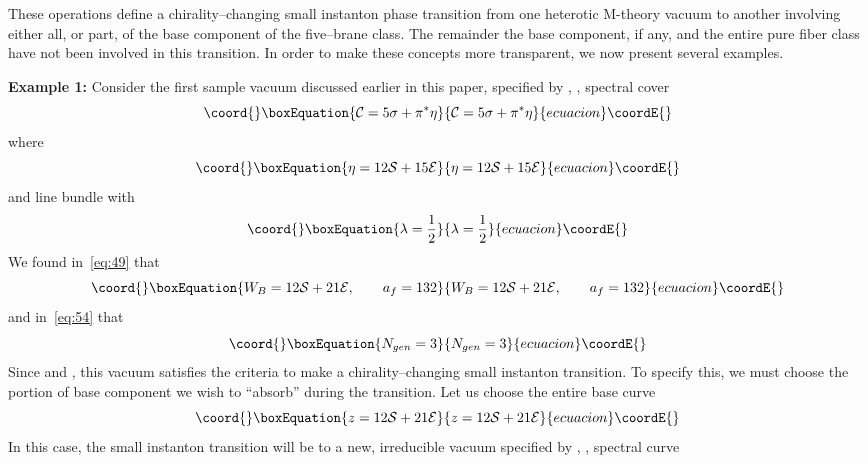 \documentclass[a4paper,12pt]{article}
\numberwithin{equation}{section}
\def\cC{{\mathcal C}}
\def\cE{{\mathcal E}}
\def\cN{{\mathcal N}}
\def\cS{{\mathcal S}}
\theoremstyle{plain}
\begin{document}
These operations define a chirality--changing small instanton phase transition
from one heterotic M-theory vacuum to another involving either all, or part, of
the base component of the five--brane class. The remainder the base
component, if any, and the entire pure fiber class have not been involved in
this transition. In order to make these concepts more transparent, we now
present several examples.

\bigskip

\noindent
{\bf Example 1:}
Consider the first sample vacuum discussed earlier in this paper, specified by
\coordHE{}, \coordHE{}, spectral cover
\begin{equation}\coord{}\boxEquation{
\cC=5\sigma+\pi^{*}\eta
\label{eq:103}
}{
\cC=5\sigma+\pi^{*}\eta
}{ecuacion}\coordE{}\end{equation}
where
\begin{equation}\coord{}\boxEquation{
\eta=12\cS+15\cE
\label{eq:104}
}{
\eta=12\cS+15\cE
}{ecuacion}\coordE{}\end{equation}
and line bundle \myHighlight{$\cN$}\coordHE{} with
\begin{equation}\coord{}\boxEquation{
\lambda=\frac{1}{2}
\label{eq:105}
}{
\lambda=\frac{1}{2}
}{ecuacion}\coordE{}\end{equation}
We found in~\eqref{eq:49} that
\begin{equation}\coord{}\boxEquation{
W_{B}=12\cS+21\cE, \qquad a_{f}=132
\label{eq:106}
}{
W_{B}=12\cS+21\cE, \qquad a_{f}=132
}{ecuacion}\coordE{}\end{equation}
and in~\eqref{eq:54} that 
\begin{equation}\coord{}\boxEquation{
N_{gen}=3
\label{eq:107}
}{
N_{gen}=3
}{ecuacion}\coordE{}\end{equation}
Since \coordHE{} and \coordHE{}, this vacuum satisfies the
criteria to make a chirality--changing small instanton transition. To specify
this, we must choose the portion of base component \coordHE{} we wish to
``absorb'' during the transition. Let us choose the entire base curve
\begin{equation}\coord{}\boxEquation{
z=12\cS+21\cE
\label{eq:108}
}{
z=12\cS+21\cE
}{ecuacion}\coordE{}\end{equation}
In this case, the small instanton transition will be to a new, irreducible
vacuum specified by \coordHE{}, \coordHE{}, spectral curve
\end{document}

